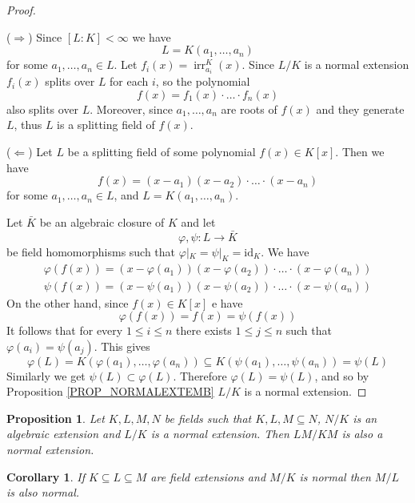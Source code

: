 \documentclass[12pt, letterpaper, oneside]{article}
\theoremstyle{plain}
\newtheorem{proposition}[theorem]{Proposition}
\newtheorem{corollary}[theorem]{Corollary}
\theoremstyle{definition}
\newcommand{\id}{\mathrm{id}}
\newcommand{\irr}{\operatorname{irr}}
\newcommand{\vs}{\vskip 5mm}
\begin{document}
\begin{proof} \ 

($\Rightarrow$)   Since $[L:K] < \infty$ we have 
$$L = K(a_{1}, \dots, a_{n})$$ 
for some $a_{1}, \dots, a_{n}\in L$. Let $f_{i}(x) = \irr^{K}_{a_{i}}(x)$. 
Since $L/K$ is a normal extension $f_{i}(x)$ splits over $L$ for each $i$, 
so the polynomial 
 $$f(x) = f_{1}(x)\cdot{\dots}\cdot f_{n}(x)$$
also splits over $L$. Moreover, since $a_{1}, \dots, a_{n}$ are roots of $f(x)$
and they generate $L$, thus $L$ is a splitting field of $f(x)$. 

\vs

($\Leftarrow$) Let $L$ be a splitting field of some polynomial $f(x)\in K[x]$. 
Then we have 
$$f(x) = (x-a_{1})(x-a_{2})\cdot{\dots}\cdot(x-a_{n})$$
for some $a_{1}, \dots, a_{n}\in L$, and $L= K(a_{1}, \dots, a_{n})$. 

Let $\bar{K}$ be an algebraic  closure of $K$ and let 
$$\varphi, \psi\colon L \to \bar{K}$$
be field homomorphisms such that $\varphi|_{K} = \psi|_{K} = \id_{K}$.
We have 
\begin{align*}
\varphi(f(x)) = (x-\varphi(a_{1}))(x-\varphi(a_{2}))\cdot{\dots}\cdot(x-\varphi(a_{n})) \\
\psi(f(x)) =  (x-\psi(a_{1}))(x-\psi(a_{2}))\cdot{\dots}\cdot(x-\psi(a_{n})) 
\end{align*}
On the other hand, since $f(x)\in K[x]$ e have 
$$\varphi(f(x)) = f(x) = \psi(f(x))$$
It follows that for every $1\leq i \leq n$ there exists $1\leq j \leq n$ such that 
$\varphi(a_{i}) = \psi(a_{j})$. This gives 
$$\varphi(L) = K(\varphi(a_{1}), \dots, \varphi(a_{n})) 
\subseteq K(\psi(a_{1}), \dots, \psi(a_{n})) = \psi(L)$$
Similarly we get $\psi(L)\subset \varphi(L)$. Therefore  $\varphi(L)= \psi(L)$, and 
so by Proposition \ref{PROP_NORMALEXTEMB} $L/K$ is a normal extension.  

\end{proof}


\vs\vs


\begin{proposition}
\label{PROP_LMKMNORMALEXT}
Let $K, L, M, N$ be fields such that $K, L, M \subseteq N$, $N/K$  is an algebraic 
extension and $L/K$ is a normal extension. Then  $LM/KM$ is also a normal extension. 
\end{proposition}


\vs\vs

\begin{corollary}
\label{COR_MKNORMMLNORM}
If $K\subseteq L \subseteq M$ are field extensions and $M/K$ is normal then $M/L$
is also normal. 
\end{corollary}
\end{document}
